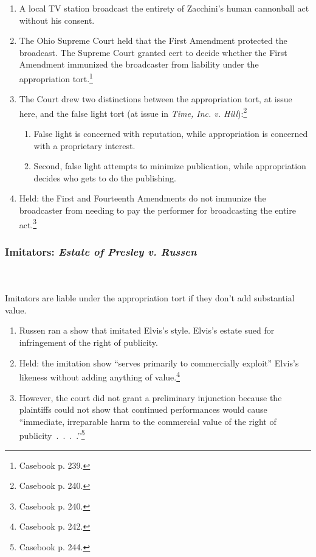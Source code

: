 \begin{enumerate}
    \item A local TV station broadcast the entirety of Zacchini's human 
    cannonball act without his consent.
    \item The Ohio Supreme Court held that the First Amendment protected the 
    broadcast. The Supreme Court granted cert to decide whether the First 
    Amendment immunized the broadcaster from liability under the appropriation 
    tort.\footnote{Casebook p. 239.}
    \item The Court drew two distinctions between the appropriation tort, at 
    issue here, and the false light tort (at issue in \emph{Time, Inc. v.  
    Hill}):\footnote{Casebook p. 240.}
    \begin{enumerate}
        \item False light is concerned with reputation, while appropriation is 
        concerned with a proprietary interest.
        \item Second, false light attempts to minimize publication, while 
        appropriation decides who gets to do the publishing.
    \end{enumerate}
    \item Held: the First and Fourteenth Amendments do not immunize the 
    broadcaster from needing to pay the performer for broadcasting the entire 
    act.\footnote{Casebook p. 240.}
\end{enumerate}

\subsubsection{Imitators: \emph{Estate of Presley v. Russen}}
~\\\\
Imitators are liable under the appropriation tort if they don't add substantial 
value.

\begin{enumerate}
    \item Russen ran a show that imitated Elvis's style. Elvis's estate sued for 
    infringement of the right of publicity.
    \item Held: the imitation show ``serves primarily to commercially exploit'' 
    Elvis's likeness without adding anything of value.\footnote{Casebook p.  
    242.}
    \item However, the court did not grant a preliminary injunction because the 
    plaintiffs could not show that continued performances would cause 
    ``immediate, irreparable harm to the commercial value of the right of 
    publicity~.~.~.~.''\footnote{Casebook p. 244.}
\end{enumerate}

